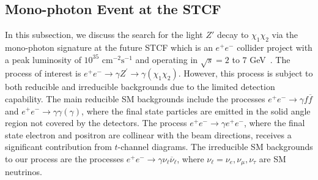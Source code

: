 \documentclass[preprint, superscriptaddress,amsmath, nofootinbib]{revtex4-1}
\begin{document}
\subsection{Mono-photon Event at the STCF}
\label{subsec:4d}
In this subsection, we discuss the search for the light $Z'$ decay to $\chi_1\chi_2$ via the mono-photon signature at the future STCF which is an $e^+e^-$ collider project with a peak luminosity of $10^{35}$ $\text{cm}^{-2}\text{s}^{-1}$ and operating in $\sqrt{s} = 2$ to $7$ GeV~\cite{Barniakov:2019zhx,Liang:2021kgw}. The process of interest is $e^{+} e^{-} \rightarrow \gamma Z^{\prime} \rightarrow \gamma (\chi_1 \chi_2)$. However, this process is subject to both reducible and irreducible backgrounds due to the limited detection capability. The main reducible SM backgrounds include the processes $e^{+}e^{-} \rightarrow \gamma f \overline{f}$ and $e^{+}e^{-} \rightarrow \gamma \gamma (\gamma)$, where the final state particles are emitted in the solid angle region not covered by the detectors. %
The process $e^{+}e^{-} \rightarrow \gamma e^{+}e^{-}$, where the final state electron and positron are collinear with the beam directions, receives a significant contribution from $t$-channel diagrams. The irreducible SM backgrounds to our process are the processes $e^{+}e^{-} \rightarrow \gamma \nu_{\ell} \overline{\nu}_{\ell}$, where $\nu_{\ell} = \nu_{e}, \nu_{\mu},\nu_{\tau}$ are SM neutrinos. 
\end{document}
